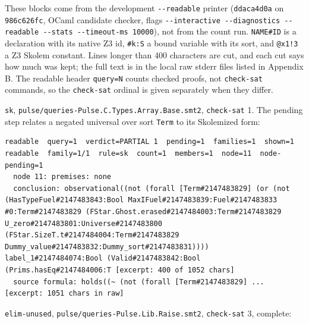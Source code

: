 \documentclass[10pt,a4paper]{article}
\begin{document}
These blocks come from the development \texttt{-{}\allowbreak{}-{}\allowbreak{}readable} printer (\texttt{ddaca4d0a} on \texttt{986c626fc}, OCaml candidate checker, flags \texttt{-{}\allowbreak{}-{}\allowbreak{}interactive -{}\allowbreak{}-{}\allowbreak{}diagnostics -{}\allowbreak{}-{}\allowbreak{}readable -{}\allowbreak{}-{}\allowbreak{}stats -{}\allowbreak{}-{}\allowbreak{}timeout-{}\allowbreak{}ms 10000}), not from the count run. \texttt{NAME\#ID} is a declaration with its native Z3 id, \texttt{\#k:\allowbreak{}S} a bound variable with its sort, and \texttt{@x1!3} a Z3 Skolem constant. Lines longer than 400 characters are cut, and each cut says how much was kept; the full text is in the local raw stderr files listed in Appendix B. The readable header \texttt{query=\allowbreak{}N} counts checked proofs, not \texttt{check-{}\allowbreak{}sat} commands, so the \texttt{check-{}\allowbreak{}sat} ordinal is given separately when they differ.

\texttt{sk}, \texttt{pulse/\allowbreak{}queries-{}\allowbreak{}Pulse.\allowbreak{}C.\allowbreak{}Types.\allowbreak{}Array.\allowbreak{}Base.\allowbreak{}smt2}, \texttt{check-{}\allowbreak{}sat} 1. The pending step relates a negated universal over sort \texttt{Term} to its Skolemized form:

\begin{lstlisting}[basicstyle=\ttfamily\footnotesize,breaklines=true,breakatwhitespace=false,columns=fullflexible,keepspaces=true,showstringspaces=false,breakindent=1.5em,postbreak=\mbox{\textcolor{gray}{$\hookrightarrow$}\space},frame=single,rulecolor=\color{lightgray},xleftmargin=2pt,xrightmargin=2pt,aboveskip=6pt,belowskip=6pt]
readable  query=1  verdict=PARTIAL 1  pending=1  families=1  shown=1
readable  family=1/1  rule=sk  count=1  members=1  node=11  node-pending=1
  node 11: premises: none
  conclusion: observational((not (forall [Term#2147483829] (or (not (HasTypeFuel#2147483843:Bool MaxIFuel#2147483839:Fuel#2147483833 #0:Term#2147483829 (FStar.Ghost.erased#2147484003:Term#2147483829 U_zero#2147483801:Universe#2147483800 (FStar.SizeT.t#2147484004:Term#2147483829 Dummy_value#2147483832:Dummy_sort#2147483831)))) label_1#2147484074:Bool (Valid#2147483842:Bool (Prims.hasEq#2147484006:T [excerpt: 400 of 1052 chars]
  source formula: holds((~ (not (forall [Term#2147483829] ... [excerpt: 1051 chars in raw]
\end{lstlisting}

\texttt{elim-{}\allowbreak{}unused}, \texttt{pulse/\allowbreak{}queries-{}\allowbreak{}Pulse.\allowbreak{}Lib.\allowbreak{}Raise.\allowbreak{}smt2}, \texttt{check-{}\allowbreak{}sat} 3, complete:
\end{document}
